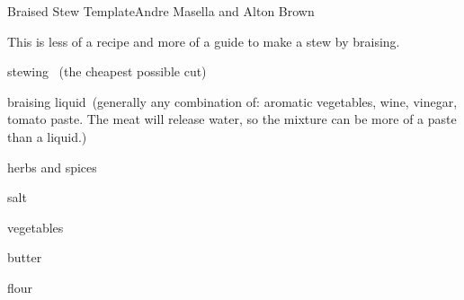 \begin{recipe}{Braised Stew Template}{Andre Masella and Alton Brown}{}

This is less of a recipe and more of a guide to make a stew by braising.

\begin{ingredients}
\item stewing ~(the cheapest possible cut)
\item braising liquid~(generally any combination of: aromatic vegetables, wine, vinegar, tomato paste. The meat will release water, so the mixture can be more of a paste than a liquid.)
\item herbs and spices
\item salt
\item vegetables
\item butter
\item flour
\end{ingredients}


\end{recipe}
